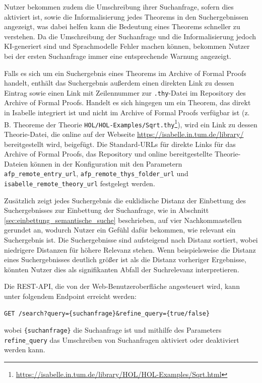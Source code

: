 \documentclass[12pt,letterpaper]{article} %
\begin{document}
Nutzer bekommen zudem die Umschreibung ihrer Suchanfrage, sofern dies aktiviert ist, sowie die Informalisierung jedes Theorems in den Suchergebnissen angezeigt, was dabei helfen kann die Bedeutung eines Theorems schneller zu verstehen.
Da die Umschreibung der Suchanfrage und die Informalisierung jedoch KI-generiert sind und Sprachmodelle Fehler machen können, bekommen Nutzer bei der ersten Suchanfrage immer eine entsprechende Warnung angezeigt.

Falls es sich um ein Suchergebnis eines Theorems im Archive of Formal Proofs handelt, enthält das Suchergebnis außerdem einen direkten Link zu dessen Eintrag sowie einen Link mit Zeilennummer zur \texttt{.thy}-Datei im Repository des Archive of Formal Proofs.
Handelt es sich hingegen um ein Theorem, das direkt in Isabelle integriert ist und nicht im Archive of Formal Proofs verfügbar ist (z. B. Theoreme der Theorie \texttt{HOL/HOL-Examples/Sqrt.thy}\footnote{\url{https://isabelle.in.tum.de/library/HOL/HOL-Examples/Sqrt.html}}), wird ein Link zu dessen Theorie-Datei, die online auf der Webseite \url{https://isabelle.in.tum.de/library/} bereitgestellt wird, beigefügt.
Die Standard-URLs für direkte Links für das Archive of Formal Proofs, das Repository und online bereitgestellte Theorie-Dateien können in der Konfiguration mit den Parametern \texttt{afp\_remote\_entry\_url}, \texttt{afp\_remote\_thys\_folder\_url} und \texttt{isabelle\_remote\_theory\_url} festgelegt werden.

Zusätzlich zeigt jedes Suchergebnis die euklidische Distanz der Einbettung des Suchergebnisses zur Einbettung der Suchanfrage, wie in Abschnitt \ref{sec:einbettung_semantische_suche} beschrieben, auf vier Nachkommastellen gerundet an, wodurch Nutzer ein Gefühl dafür bekommen, wie relevant ein Suchergebnis ist.
Die Suchergebnisse sind aufsteigend nach Distanz sortiert, wobei niedrigere Distanzen für höhere Relevanz stehen.
Wenn beispielsweise die Distanz eines Suchergebnisses deutlich größer ist als die Distanz vorheriger Ergebnisse, könnten Nutzer dies als signifikanten Abfall der Suchrelevanz interpretieren.

Die REST-API, die von der Web-Benutzeroberfläche angesteuert wird, kann unter folgendem Endpoint erreicht werden:
\begin{verbatim}
GET /search?query={suchanfrage}&refine_query={true/false}
\end{verbatim}
wobei \texttt{\{suchanfrage\}} die Suchanfrage ist und mithilfe des Parameters \texttt{refine\_query} das Umschreiben von Suchanfragen aktiviert oder deaktiviert werden kann.
\end{document}
